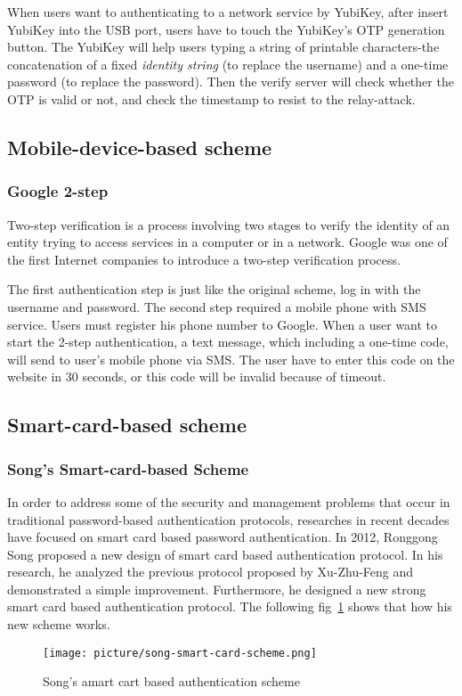 \begin{CJK}{Bg5}{bsmi}
When users want to authenticating to a network service by YubiKey, after insert YubiKey into the USB port, users have to touch the YubiKey's OTP generation button. The YubiKey will help users typing a string of printable characters-the concatenation of a fixed \emph{identity string} (to replace the username) and a one-time password (to replace the password). Then the verify server will check whether the OTP is valid or not, and check the timestamp to resist to the relay-attack.

\subsection{Mobile-device-based scheme}

\subsubsection{Google 2-step}

Two-step verification is a process involving two stages to verify the identity of an entity trying to access services in a computer or in a network. Google was one of the first Internet companies to introduce a two-step verification process\cite{google-2-step}. 

The first authentication step is just like the original scheme, log in with the username and password. The second step required a mobile phone with SMS service. Users must register his phone number to Google. When a user want to start the 2-step authentication, a text message, which including a one-time code, will send to user's mobile phone via SMS. The user have to enter this code on the website in 30 seconds, or this code will be invalid because of timeout.

\subsection{Smart-card-based scheme}

\subsubsection{Song's Smart-card-based Scheme}

In order to address some of the security and management problems that occur in traditional password-based authentication protocols, researches in recent decades have focused on smart card based password authentication. In 2012, Ronggong Song proposed a new design of smart card based authentication protocol\cite{smart-card}. In his research, he analyzed the previous protocol proposed by Xu-Zhu-Feng and demonstrated a simple improvement. Furthermore, he designed a new strong smart card based authentication protocol. The following fig~\ref{fig:song-smard-card-scheme} shows that how his new scheme works.

\begin{figure}
\centering
\texttt{[image: picture/song-smart-card-scheme.png]}
\caption{Song's amart cart based authentication scheme}
\label{fig:song-smard-card-scheme}
\end{figure}
\end{CJK}